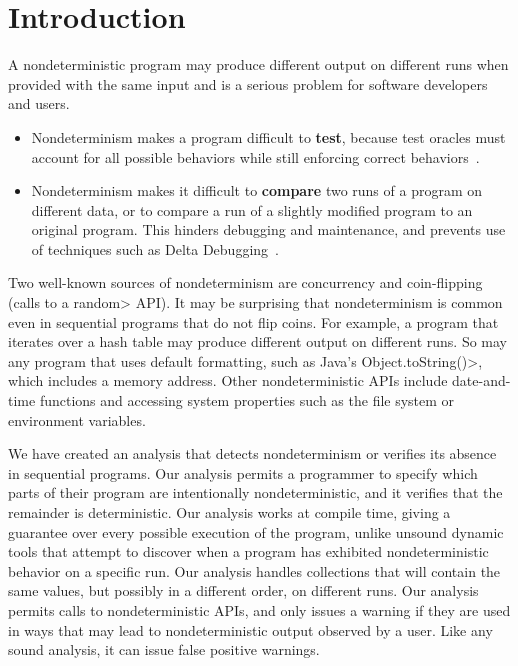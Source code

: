 \section{Introduction\label{sec:introduction}}

A nondeterministic program may produce different output on different runs
when provided with the same input and is a serious problem for software developers and users.
\begin{itemize}
\item
  Nondeterminism makes a program difficult to \textbf{test}, because test
  oracles must account for all possible behaviors while still enforcing
  correct behaviors~\cite{LuoHEM2014,ShiGLM2016,BellLHEYM2018,Sudarshan}.
\item
  Nondeterminism makes it difficult to \textbf{compare} two runs of a
  program on different data, or to compare a run of a slightly modified
  program to an original program.  This hinders debugging and maintenance,
  and prevents use of techniques such as Delta Debugging~\cite{Zeller1999,YuLCZ2012}.
\end{itemize}

Two well-known sources of nondeterminism are concurrency
and coin-flipping
(calls to a \<random> API\@).
It may be surprising that nondeterminism is common even in sequential
programs that do not flip coins.
For example, a program that iterates over a hash table
may produce different output on different runs.
So may any program that uses default formatting, such as Java's
\<Object.toString()>, which includes a memory address.
Other nondeterministic APIs include date-and-time functions and
accessing system properties such as the file system or environment variables.

We have created an analysis that detects nondeterminism or verifies its
absence in sequential programs.
Our analysis permits a programmer to specify which parts of their program
are intentionally nondeterministic, and it verifies that the remainder is deterministic.
Our analysis works at compile time, giving a guarantee over every possible
execution of the program, unlike unsound dynamic tools that attempt
to discover when a program has exhibited nondeterministic behavior on a
specific run.  
Our analysis handles collections that will contain the same values, but
possibly in a different order, on different runs.
Our analysis permits calls to
nondeterministic APIs, and only issues a warning if they are used in ways
that may lead to nondeterministic output observed by a user.  Like any
sound analysis, it can issue false positive warnings.

